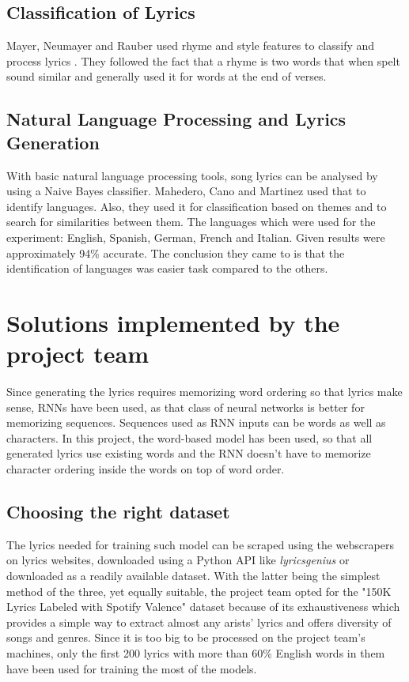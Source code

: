 \documentclass[conference]{IEEEtran}
\begin{document}
\subsection{Classification of Lyrics}
Mayer, Neumayer and Rauber used rhyme and style features to classify and process lyrics \cite{b6}. 
They followed the fact that a rhyme is two words that when spelt sound similar and generally used it for words at the end of verses.

\subsection{Natural Language Processing and Lyrics Generation}
With basic natural language processing tools, song lyrics can be analysed by using a Naive Bayes classifier. Mahedero, Cano and Martinez used that to 
identify languages. Also, they used it for classification based on themes and to search for similarities between them. 
The languages which were used for the experiment: English, Spanish, German, French and Italian. Given results were approximately 94\% accurate.
The conclusion they came to is that the identification of languages was easier task compared to the others.

\section{Solutions implemented by the project team} %
Since generating the lyrics requires memorizing word ordering so that lyrics
make sense, RNNs have been used, as that class of neural networks is better for
memorizing sequences. Sequences used as RNN inputs can be words as well as
characters. In this project, the word-based model has been used, so that
all generated lyrics use existing words and the RNN doesn't have to memorize
character ordering inside the words on top of word order.

\subsection{Choosing the right dataset}
The lyrics needed for training such model can be scraped using the webscrapers on
lyrics websites, downloaded using a Python API like \textit{lyricsgenius} or
downloaded as a readily available dataset. With the latter being the simplest
method of the three, yet equally suitable, the project team opted for the
"150K Lyrics Labeled with Spotify Valence" dataset because of its exhaustiveness
which provides a simple way to extract almost any arists' lyrics and  offers
diversity of songs and genres. Since it is too big to be processed on the
project team's machines, only the first 200 lyrics with more than 60\% English
words in them have been used for training the most of the models.
\end{document}
